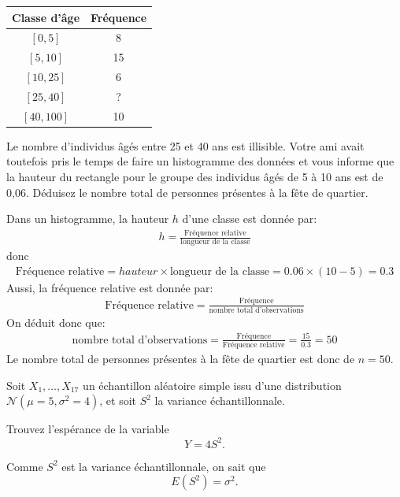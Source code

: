 \begin{questions}
\begin{table}[h!]
\begin{center}
\begin{tabular}{c|c}
Classe d'âge & Fréquence \\
\hline
$[0,5]$ & 8 \\
$[5,10]$ & 15 \\
$[10, 25]$ & 6 \\
$[25, 40]$ & ? \\
$[40, 100]$ & 10 
\end{tabular}
\end{center}
\end{table}

Le nombre d'individus âgés entre 25 et 40 ans est illisible. Votre ami avait toutefois pris le temps de faire un histogramme des données et vous informe que la hauteur du rectangle pour le groupe des individus âgés de 5 à 10 ans est de 0,06. Déduisez le nombre total de personnes présentes à la fête de quartier. 

\begin{solution}
Dans un histogramme, la hauteur $h$ d'une classe est donnée par: 
\begin{align*}
h=\frac{\mbox{Fréquence relative}}{\mbox{longueur de la classe}}
\end{align*}
donc
\begin{align*}
\mbox{Fréquence relative}=hauteur\times\mbox{longueur de la classe}=0.06\times(10-5)=0.3
\end{align*}
Aussi, la fréquence relative est donnée par: 
\begin{align*}
\mbox{Fréquence relative}=\frac{\mbox{Fréquence}}{\mbox{nombre total d'observations}}
\end{align*}
On déduit donc que: 
\begin{align*}
\mbox{nombre total d'observations} =\frac{\mbox{Fréquence}}{\mbox{Fréquence relative}}=\frac{15}{0.3}=50
\end{align*}
Le nombre total de personnes présentes à la fête de quartier est donc de $n=50$.    
\end{solution}

\newpage



\question[6]
Soit \(X_1,\ldots,X_{17}\) un échantillon aléatoire simple issu d'une distribution $\mathcal{N}(\mu=5,\sigma^2=4)$,
et soit \(S^2\) la variance échantillonnale.

Trouvez l'espérance de la variable
\[
Y=4S^2.
\]
\vspace{2.5in}
\begin{solution}
Comme \(S^2\) est la variance échantillonnale, on sait que
\[
E(S^2)=\sigma^2.
\]


\end{solution}
\end{questions}
